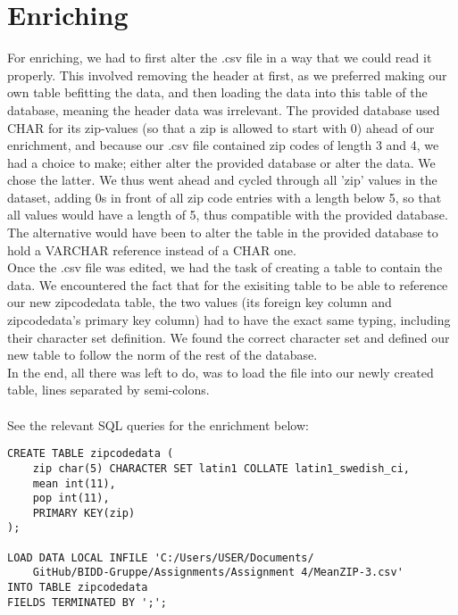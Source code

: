 \section*{Enriching}
For enriching, we had to first alter the .csv file in a way that we could read it properly. This involved removing the header at first, as we preferred making our own table befitting the data, and then loading the data into this table of the database, meaning the header data was irrelevant. The provided database used CHAR for its zip-values (so that a zip is allowed to start with 0) ahead of our enrichment, and because our .csv file contained zip codes of length 3 and 4, we had a choice to make; either alter the provided database or alter the data. We chose the latter. We thus went ahead and cycled through all 'zip' values in the dataset, adding 0s in front of all zip code entries with a length below 5, so that all values would have a length of 5, thus compatible with the provided database. The alternative would have been to alter the table in the provided database to hold a VARCHAR reference instead of a CHAR one. \\
Once the .csv file was edited, we had the task of creating a table to contain the data. We encountered the fact that for the exisiting table to be able to reference our new zipcodedata table, the two values (its foreign key column and zipcodedata's primary key column) had to have the exact same typing, including their character set definition. We found the correct character set and defined our new table to follow the norm of the rest of the database. \\
In the end, all there was left to do, was to load the file into our newly created table, lines separated by semi-colons. \\
\\
See the relevant SQL queries for the enrichment below: \\

\begin{lstlisting}
CREATE TABLE zipcodedata (
	zip char(5) CHARACTER SET latin1 COLLATE latin1_swedish_ci,
	mean int(11),
	pop int(11),
	PRIMARY KEY(zip)
);

LOAD DATA LOCAL INFILE 'C:/Users/USER/Documents/
	GitHub/BIDD-Gruppe/Assignments/Assignment 4/MeanZIP-3.csv'
INTO TABLE zipcodedata
FIELDS TERMINATED BY ';';
\end{lstlisting}
